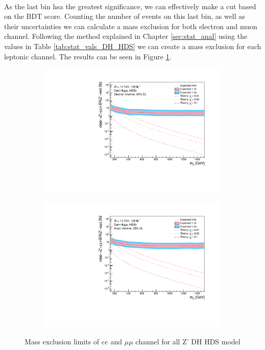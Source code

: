 \documentclass[12pt, a4paper]{book}
\begin{document}
\\As the last bin hsa the greatest significance, we can effectively make a cut based on the BDT score. Counting the number of events on this last bin, as well as their uncertainties we can calculate a mass exclusion for both electron and muon channel. 
Following the method explained in Chapter \ref{sec:stat_anal} using the values in Table \ref{tab:stat_vals_DH_HDS} we can create a mass exclusion for each leptonic channel. The results can be seen in Figure \ref{fig:DH_HDS_exclusion_ee_uu}.
\clearpage
\begin{figure}[!ht]
	\centering
   \begin{subfigure}[b]{0.49\textwidth}
      \centering
      \includegraphics[width=1\textwidth]{Limits/DH_HDS/mass_exclusion_ee.pdf}
      \end{subfigure}
   \hfill
   \begin{subfigure}[b]{0.49\textwidth}
      \centering
      \includegraphics[width=1\textwidth]{Limits/DH_HDS/mass_exclusion_uu.pdf}
      \end{subfigure}
   \caption{Mass exclusion limits of $ee$ and $\mu\mu$ channel for all Z' DH HDS model}\label{fig:DH_HDS_exclusion_ee_uu}
\end{figure}
\end{document}
